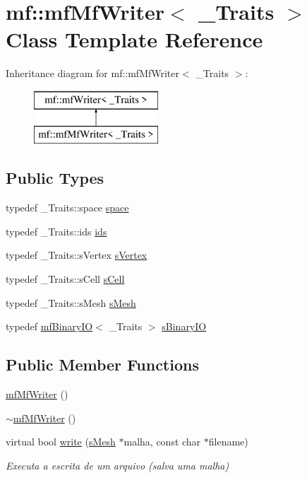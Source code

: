 \hypertarget{classmf_1_1mfMfWriter}{
\section{mf::mfMfWriter$<$ \_\-Traits $>$ Class Template Reference}
\label{classmf_1_1mfMfWriter}
}
Inheritance diagram for mf::mfMfWriter$<$ \_\-Traits $>$:\begin{figure}[H]
\begin{center}
\leavevmode
\includegraphics[height=2.000000cm]{classmf_1_1mfMfWriter}
\end{center}
\end{figure}
\subsection*{Public Types}
\begin{DoxyCompactItemize}
\item 
typedef \_\-Traits::space \hyperlink{classmf_1_1mfMfWriter_a21bbac0be4b7669c31b1bb300e21b1e3}{space}
\item 
typedef \_\-Traits::ids \hyperlink{classmf_1_1mfMfWriter_a46296c1b8fe7d05f31495f65457ac945}{ids}
\item 
typedef \_\-Traits::sVertex \hyperlink{classmf_1_1mfMfWriter_a01f8809f4b57ba5f886abe7f511da32c}{sVertex}
\item 
typedef \_\-Traits::sCell \hyperlink{classmf_1_1mfMfWriter_a58fa8a1a76014a24f6f52fc77dd9cbb0}{sCell}
\item 
typedef \_\-Traits::sMesh \hyperlink{classmf_1_1mfMfWriter_a2d08e4dc5186064ec4ef99b2d7442f5c}{sMesh}
\item 
typedef \hyperlink{classmf_1_1mfBinaryIO}{mfBinaryIO}$<$ \_\-Traits $>$ \hyperlink{classmf_1_1mfMfWriter_aeeeccedc6616f608f33cf42ca2e68dcc}{sBinaryIO}
\end{DoxyCompactItemize}
\subsection*{Public Member Functions}
\begin{DoxyCompactItemize}
\item 
\hyperlink{classmf_1_1mfMfWriter_acde356a4e00b8cd677fefedac6e0330b}{mfMfWriter} ()
\item 
\hyperlink{classmf_1_1mfMfWriter_af15ffd11140c3c11ba20496bc12301a9}{$\sim$mfMfWriter} ()
\item 
virtual bool \hyperlink{classmf_1_1mfMfWriter_a2fc75ae58c2e75f24924c812aec7bc8a}{write} (\hyperlink{classmf_1_1mfMfWriter_a2d08e4dc5186064ec4ef99b2d7442f5c}{sMesh} $\ast$malha, const char $\ast$filename)
\begin{DoxyCompactList}\small\item\em Executa a escrita de um arquivo (salva uma malha) \item\end{DoxyCompactList}\end{DoxyCompactItemize}
